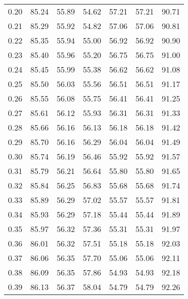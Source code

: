 \begin{tabular}{|c|c|c|c|c|c|c|}
      0.20 &     85.24 &     55.89 &      54.62 &   57.21 &      57.21 &         90.71 \\
      0.21 &     85.29 &     55.92 &      54.82 &   57.06 &      57.06 &         90.81 \\
      0.22 &     85.35 &     55.94 &      55.00 &   56.92 &      56.92 &         90.90 \\
      0.23 &     85.40 &     55.96 &      55.20 &   56.75 &      56.75 &         91.00 \\
      0.24 &     85.45 &     55.99 &      55.38 &   56.62 &      56.62 &         91.08 \\
      0.25 &     85.50 &     56.03 &      55.56 &   56.51 &      56.51 &         91.17 \\
      0.26 &     85.55 &     56.08 &      55.75 &   56.41 &      56.41 &         91.25 \\
      0.27 &     85.61 &     56.12 &      55.93 &   56.31 &      56.31 &         91.33 \\
      0.28 &     85.66 &     56.16 &      56.13 &   56.18 &      56.18 &         91.42 \\
      0.29 &     85.70 &     56.16 &      56.29 &   56.04 &      56.04 &         91.49 \\
      0.30 &     85.74 &     56.19 &      56.46 &   55.92 &      55.92 &         91.57 \\
      0.31 &     85.79 &     56.21 &      56.64 &   55.80 &      55.80 &         91.65 \\
      0.32 &     85.84 &     56.25 &      56.83 &   55.68 &      55.68 &         91.74 \\
      0.33 &     85.89 &     56.29 &      57.02 &   55.57 &      55.57 &         91.81 \\
      0.34 &     85.93 &     56.29 &      57.18 &   55.44 &      55.44 &         91.89 \\
      0.35 &     85.97 &     56.32 &      57.36 &   55.31 &      55.31 &         91.97 \\
      0.36 &     86.01 &     56.32 &      57.51 &   55.18 &      55.18 &         92.03 \\
      0.37 &     86.06 &     56.35 &      57.70 &   55.06 &      55.06 &         92.11 \\
      0.38 &     86.09 &     56.35 &      57.86 &   54.93 &      54.93 &         92.18 \\
      0.39 &     86.13 &     56.37 &      58.04 &   54.79 &      54.79 &         92.26 \\

\end{tabular}
